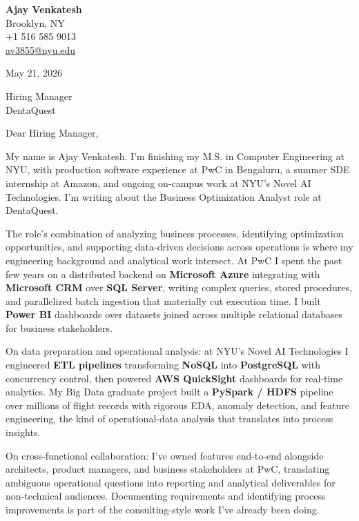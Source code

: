 \documentclass[letterpaper,11pt]{article}
\begin{document}
\begin{flushleft}
\textbf{\large Ajay Venkatesh} \\
Brooklyn, NY \\
+1 516 585 9013 \\
\href{mailto:av3855@nyu.edu}{av3855@nyu.edu}
\end{flushleft}
\vspace{10pt}
May 21, 2026
\vspace{6pt}

Hiring Manager \\
DentaQuest

\vspace{10pt}

Dear Hiring Manager,

My name is Ajay Venkatesh. I'm finishing my M.S. in Computer Engineering at NYU, with production software experience at PwC in Bengaluru, a summer SDE internship at Amazon, and ongoing on-campus work at NYU's Novel AI Technologies. I'm writing about the Business Optimization Analyst role at DentaQuest.

The role's combination of analyzing business processes, identifying optimization opportunities, and supporting data-driven decisions across operations is where my engineering background and analytical work intersect. At PwC I spent the past few years on a distributed backend on \textbf{Microsoft Azure} integrating with \textbf{Microsoft CRM} over \textbf{SQL Server}, writing complex queries, stored procedures, and parallelized batch ingestion that materially cut execution time. I built \textbf{Power BI} dashboards over datasets joined across multiple relational databases for business stakeholders.

On data preparation and operational analysis: at NYU's Novel AI Technologies I engineered \textbf{ETL pipelines} transforming \textbf{NoSQL} into \textbf{PostgreSQL} with concurrency control, then powered \textbf{AWS QuickSight} dashboards for real-time analytics. My Big Data graduate project built a \textbf{PySpark / HDFS} pipeline over millions of flight records with rigorous EDA, anomaly detection, and feature engineering, the kind of operational-data analysis that translates into process insights.

On cross-functional collaboration: I've owned features end-to-end alongside architects, product managers, and business stakeholders at PwC, translating ambiguous operational questions into reporting and analytical deliverables for non-technical audiences. Documenting requirements and identifying process improvements is part of the consulting-style work I've already been doing.
\end{document}
